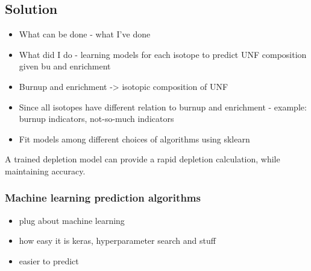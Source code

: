 \subsection{Solution}
\begin{itemize}
    \item What can be done - what I've done
    \item What did I do - learning models for each isotope to predict UNF composition given bu and enrichment
    \item Burnup and enrichment -> isotopic composition of UNF
    \item Since all isotopes have different relation to burnup and enrichment
            - example: burnup indicators, not-so-much indicators
    \item Fit models among different choices of algorithms using sklearn
\end{itemize}

A trained depletion model can provide a rapid depletion calculation, while
maintaining accuracy.



\subsubsection{Machine learning prediction algorithms}

\begin{itemize}
    \item plug about machine learning
    \item how easy it is keras, hyperparameter search and stuff
    \item easier to predict
\end{itemize}
